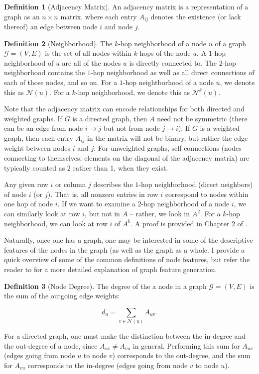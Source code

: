\documentclass[12pt]{article}
\theoremstyle{definition}
\newtheorem{definition}{Definition}[section]
\begin{document}
\begin{definition}[Adjacency Matrix]
An adjacency matrix is a representation of a graph as an $n \times n$ matrix, where each entry $A_{ij}$ denotes the existence (or lack thereof) an edge between node $i$ and node $j$. 
\end{definition}

\begin{definition}[Neighborhood]
The $k$-hop neighborhood of a node $u$ of a graph $\mathcal{G} = (V, E)$ is the set of all nodes within $k$ hops of the node $u$. A $1$-hop neighborhood of $u$ are all of the nodes $u$ is directly connected to. The $2$-hop neighborhood contains the $1$-hop neighborhood as well as all direct connections of each of those nodes, and so on. For a $1$-hop neightborhood of a node $u$, we denote this as $\mathcal{N}(u)$. For a $k$-hop neighborhood, we denote this as $\mathcal{N}^k(u)$.
\end{definition}

Note that the adjacency matrix can encode relationships for both directed and weighted graphs. If $G$ is a directed graph, then $A$ need not be symmetric (there can be an edge from node $i \rightarrow j$ but not from node $j \rightarrow i$). If $G$ is a weighted graph, then each entry $A_{ij}$ in the matrix will not be binary, but rather the edge weight between nodes $i$ and $j$. For unweighted graphs, self connections (nodes connecting to themselves; elements on the diagonal of the adjacency matrix) are typically counted as $2$ rather than $1$, when they exist.

Any given row $i$ or column $j$ describes the $1$-hop neighborhood (direct neighbors) of node $i$ (or $j$). That is, all nonzero entries in row $i$ correspond to nodes within one hop of node $i$. If we want to examine a $2$-hop neighborhood of a node $i$, we can similarly look at row $i$, but not in $A$ -- rather, we look in $A^2$. For a $k$-hop neighborhood, we can look at row $i$ of $A^k$. A proof is provided in Chapter 2 of \cite{hamiltonGRL}.

Naturally, once one has a graph, one may be interested in some of the descriptive features of the nodes in the graph (as well as the graph as a whole. I provide a quick overview of some of the common definitions of node features, but refer the reader to \cite{mdpiGraphFeatureSurvey} for a more detailed explanation of graph feature generation.

\begin{definition}[Node Degree]
The degree of the a node in a graph $\mathcal{G} = (V, E)$ is the sum of the outgoing edge weights:

\[
d_u = \sum_{v \in \mathcal{N}(u)} A_{uv}.
\]

For a directed graph, one must make the distinction between the in-degree and the out-degree of a node, since $A_{uv} \neq A_{vu}$ in general. Performing this sum for $A_{uv}$ (edges going from node $u$ to node $v$) corresponds to the out-degree, and the sum for $A_{vu}$ corresponds to the in-degree (edges going from node $v$ to node $u$).
\end{definition}
\end{document}
